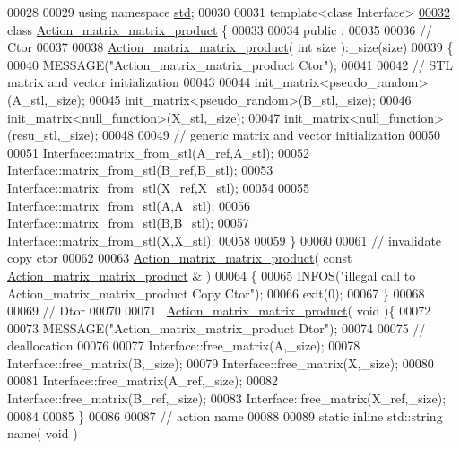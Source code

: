\begin{DoxyCode}
00028 
00029 \textcolor{keyword}{using namespace }\hyperlink{namespacestd}{std};
00030 
00031 \textcolor{keyword}{template}<\textcolor{keyword}{class} Interface>
\hyperlink{class_action__matrix__matrix__product}{00032} \textcolor{keyword}{class }\hyperlink{class_action__matrix__matrix__product}{Action\_matrix\_matrix\_product} \{
00033 
00034 public :
00035 
00036   \textcolor{comment}{// Ctor}
00037 
00038   \hyperlink{class_action__matrix__matrix__product}{Action\_matrix\_matrix\_product}( \textcolor{keywordtype}{int} size ):\_size(size)
00039   \{
00040     MESSAGE(\textcolor{stringliteral}{"Action\_matrix\_matrix\_product Ctor"});
00041 
00042     \textcolor{comment}{// STL matrix and vector initialization}
00043 
00044     init\_matrix<pseudo\_random>(A\_stl,\_size);
00045     init\_matrix<pseudo\_random>(B\_stl,\_size);
00046     init\_matrix<null\_function>(X\_stl,\_size);
00047     init\_matrix<null\_function>(resu\_stl,\_size);
00048 
00049     \textcolor{comment}{// generic matrix and vector initialization}
00050 
00051     Interface::matrix\_from\_stl(A\_ref,A\_stl);
00052     Interface::matrix\_from\_stl(B\_ref,B\_stl);
00053     Interface::matrix\_from\_stl(X\_ref,X\_stl);
00054 
00055     Interface::matrix\_from\_stl(A,A\_stl);
00056     Interface::matrix\_from\_stl(B,B\_stl);
00057     Interface::matrix\_from\_stl(X,X\_stl);
00058 
00059   \}
00060 
00061   \textcolor{comment}{// invalidate copy ctor}
00062 
00063   \hyperlink{class_action__matrix__matrix__product}{Action\_matrix\_matrix\_product}( \textcolor{keyword}{const}  
      \hyperlink{class_action__matrix__matrix__product}{Action\_matrix\_matrix\_product} & )
00064   \{
00065     INFOS(\textcolor{stringliteral}{"illegal call to Action\_matrix\_matrix\_product Copy Ctor"});
00066     exit(0);
00067   \}
00068 
00069   \textcolor{comment}{// Dtor}
00070 
00071   ~\hyperlink{class_action__matrix__matrix__product}{Action\_matrix\_matrix\_product}( \textcolor{keywordtype}{void} )\{
00072 
00073     MESSAGE(\textcolor{stringliteral}{"Action\_matrix\_matrix\_product Dtor"});
00074 
00075     \textcolor{comment}{// deallocation}
00076 
00077     Interface::free\_matrix(A,\_size);
00078     Interface::free\_matrix(B,\_size);
00079     Interface::free\_matrix(X,\_size);
00080 
00081     Interface::free\_matrix(A\_ref,\_size);
00082     Interface::free\_matrix(B\_ref,\_size);
00083     Interface::free\_matrix(X\_ref,\_size);
00084 
00085   \}
00086 
00087   \textcolor{comment}{// action name}
00088 
00089   \textcolor{keyword}{static} \textcolor{keyword}{inline} std::string name( \textcolor{keywordtype}{void} )

\end{DoxyCode}
